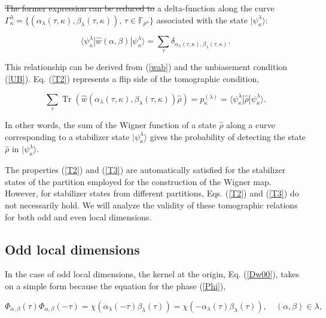 \documentclass[quantumrep,article,submit,pdftex,moreauthors]{Definitions/mdpi}
\DeclareMathOperator{\Tr}{Tr}
\providecommand{\DIFadd}[1]{{\protect\color{blue}\uwave{#1}}} %
\providecommand{\DIFdel}[1]{{\protect\color{red}\sout{#1}}}                      %
\providecommand{\DIFaddbegin}{} %
\providecommand{\DIFaddend}{} %
\providecommand{\DIFdelbegin}{} %
\providecommand{\DIFdelend}{} %
\begin{document}
\DIFdelbegin \DIFdel{The former expression can be reduced to }\DIFdelend
\DIFaddbegin \DIFadd{which is just }\DIFaddend a delta-function along the curve
$\Gamma_{\kappa}^{\lambda} =
\{(\alpha_{\lambda}(\tau,\kappa),\beta_{\lambda}(\tau,\kappa)),\,\tau \in
\mathbb F_{p^{n}}\}$ associated with the state $|\psi_{\kappa
}^{\lambda}\rangle$:

\begin{equation}
  \langle \psi_{\kappa}^{\lambda}
  |\hat{w}\left( \alpha,\beta \right)
  |\psi_{\kappa }^{\lambda}
  \rangle = \sum_{\tau} \delta_{\alpha_{\lambda}(\tau,\kappa),
  \beta_{\lambda}(\tau ,\kappa )}.
  \label{T2}
\end{equation}

This relationship can be derived from (\ref{wab}) and the unbiasement condition
(\ref{UB}). Eq. (\ref{T2}) represents a flip side of the tomographic condition,

\begin{equation}
  \sum_{\tau} \Tr\left(
    \hat{w}\left(
      \alpha_{\lambda}(\tau,\kappa),\beta_{\lambda}(\tau,\kappa)
    \right) \hat{\rho}
  \right)
  = p_{\kappa}^{(\lambda)}
  = \langle \psi_{\kappa}^{\lambda} |\hat{\rho}|\psi_{\kappa}^{\lambda}\rangle.
  \label{T3}
\end{equation}

In other words, the sum of the Wigner function of a state $\hat{\rho}$ along a
curve corresponding to a stabilizer state $|\psi_{\kappa}^{\lambda}\rangle$
gives the probability of detecting the state $\hat{\rho}$ in
$|\psi_{\kappa}^{\lambda}\rangle$.

The properties (\ref{T2}) and (\ref{T3}) are automatically satisfied for the
stabilizer states of the partition employed for the construction of the Wigner
map. However, for stabilizer states from different partitions, Eqs. (\ref{T2})
and (\ref{T3}) do not necessarily hold. We will analyze the validity of these
tomographic relations for both odd and even local dimensions.

\subsection{Odd local dimensions}

In the case of odd local dimensions, the kernel at the origin, Eq. (\ref{Dw00}),
takes on a simple form because the equation for the phase (\ref{Phi}), 

\DIFaddbegin 

\DIFaddend \begin{equation*}
  \Phi_{\alpha,\beta}(\tau) \Phi_{\alpha,\beta}(-\tau)
  = \chi\left(\alpha_{\lambda}(-\tau)\beta_{\lambda}(\tau)\right)
  = \chi\left(-\alpha_{\lambda}(\tau)\beta_{\lambda}(\tau)\right),
  \quad (\alpha,\beta) \in \lambda,
\end{equation*}
\end{document}

